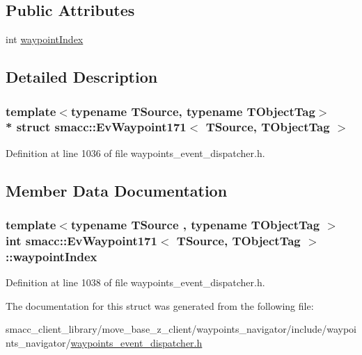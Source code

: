 \subsection*{Public Attributes}
\begin{DoxyCompactItemize}
\item 
int \hyperlink{structsmacc_1_1EvWaypoint171_a217091d66c886ad21806788699dd5b06}{waypoint\+Index}
\end{DoxyCompactItemize}


\subsection{Detailed Description}
\subsubsection*{template$<$typename T\+Source, typename T\+Object\+Tag$>$\\*
struct smacc\+::\+Ev\+Waypoint171$<$ T\+Source, T\+Object\+Tag $>$}



Definition at line 1036 of file waypoints\+\_\+event\+\_\+dispatcher.\+h.



\subsection{Member Data Documentation}
\subsubsection[{\texorpdfstring{waypoint\+Index}{waypointIndex}}]{\setlength{\rightskip}{0pt plus 5cm}template$<$typename T\+Source , typename T\+Object\+Tag $>$ int {\bf smacc\+::\+Ev\+Waypoint171}$<$ T\+Source, T\+Object\+Tag $>$\+::waypoint\+Index}\hypertarget{structsmacc_1_1EvWaypoint171_a217091d66c886ad21806788699dd5b06}{}\label{structsmacc_1_1EvWaypoint171_a217091d66c886ad21806788699dd5b06}


Definition at line 1038 of file waypoints\+\_\+event\+\_\+dispatcher.\+h.



The documentation for this struct was generated from the following file\+:\begin{DoxyCompactItemize}
\item 
smacc\+\_\+client\+\_\+library/move\+\_\+base\+\_\+z\+\_\+client/waypoints\+\_\+navigator/include/waypoints\+\_\+navigator/\hyperlink{waypoints__event__dispatcher_8h}{waypoints\+\_\+event\+\_\+dispatcher.\+h}\end{DoxyCompactItemize}
